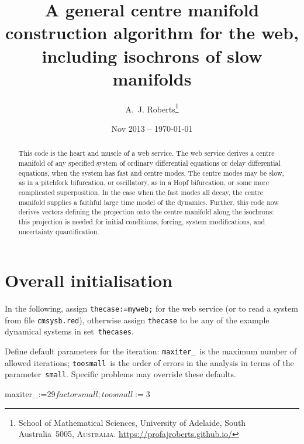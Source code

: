 \documentclass[11pt,a5paper]{article}
\title{A general centre manifold construction algorithm for the web, including isochrons of slow manifolds}
\author{A.~J. Roberts\thanks{School of Mathematical Sciences, University of Adelaide, South Australia~5005, \textsc{Australia}.
\url{https://profajroberts.github.io/}}}
\date{Nov 2013 -- \today}
\begin{document}
\maketitle

\begin{abstract}
This code is the heart and muscle of a web service.
The web service derives a centre manifold of any specified system of ordinary differential equations or delay differential equations, when the system has fast and centre modes. 
The centre modes may be slow, as in a pitchfork bifurcation, or oscillatory, as in a Hopf bifurcation, or some more complicated superposition. 
In the case when the fast modes all decay, the centre manifold supplies a faithful large time model of the dynamics. 
Further, this code now derives vectors defining the projection onto the centre manifold along the isochrons: this projection is needed for initial conditions, forcing, system modifications, and uncertainty quantification.
\end{abstract}

\tableofcontents

\section{Overall initialisation}

In the following, assign \verb|thecase:=myweb;| for the web service (or to read a system from file \verb|cmsysb.red|), otherwise assign \verb|thecase| to be any of the example dynamical systems in set~\verb|thecases|.

Define default parameters for the iteration:
\verb|maxiter_|~is the maximum number of allowed iterations;
\verb|toosmall|~is the order of errors in the analysis in terms of the parameter~\verb|small|.
Specific problems may override these defaults.

\begin{reduce}
maxiter_:=29$
factor small; 
toosmall:=3$
\end{reduce}
\end{document}
